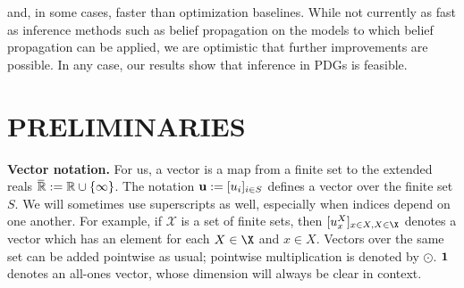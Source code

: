 \documentclass[twoside]{article}
\begin{document}
and, in some cases, faster than optimization baselines.
While not currently as fast as inference methods such as belief
propagation on the models to which belief propagation can be applied,
we are optimistic that further improvements are possible.
In any case, our results show that inference in PDGs is feasible.

\section{PRELIMINARIES}

\textbf{Vector notation.}
For us, a vector is a map from a finite set to the extended reals
    $\mskip1mu\overline{\mskip-1mu\mathbb R\!}\, := \mathbb R \cup \{\infty\}$. 
The notation $\mathbf{u} := [u_i]_{i \in S}$ defines a vector over the finite set $S$.
We will sometimes use superscripts as well, especially when indices
depend on one another. For example, if $\mathcal X$ is a set of finite
sets, then 
$[u^X_x]_{x \in X, X \in \X}$ denotes a vector which has an element
for each $X \in \X$ and $x \in X$.
Vectors over the same set can be added pointwise as usual;
pointwise multiplication is denoted by $\odot$.   
$\mathbf{1}$ denotes an all-ones vector, whose dimension will always be
clear in context. 
\end{document}
